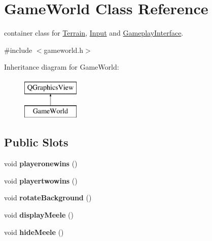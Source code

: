 \hypertarget{class_game_world}{}\section{Game\+World Class Reference}
\label{class_game_world}


container class for \hyperlink{class_terrain}{Terrain}, \hyperlink{class_input}{Input} and \hyperlink{class_gameplay_interface}{Gameplay\+Interface}.  




{\ttfamily \#include $<$gameworld.\+h$>$}

Inheritance diagram for Game\+World\+:\begin{figure}[H]
\begin{center}
\leavevmode
\includegraphics[height=2.000000cm]{class_game_world}
\end{center}
\end{figure}
\subsection*{Public Slots}
\begin{DoxyCompactItemize}
\item 
void {\bfseries playeronewins} ()\hypertarget{class_game_world_ada24b43c2a2c6d8147f2054a1e4a71c0}{}\label{class_game_world_ada24b43c2a2c6d8147f2054a1e4a71c0}

\item 
void {\bfseries playertwowins} ()\hypertarget{class_game_world_a6a0c32cf4eea04374ea6c4ec75ed3737}{}\label{class_game_world_a6a0c32cf4eea04374ea6c4ec75ed3737}

\item 
void {\bfseries rotate\+Background} ()\hypertarget{class_game_world_a4b17ac101198095db71b34cfd87b97b2}{}\label{class_game_world_a4b17ac101198095db71b34cfd87b97b2}

\item 
void {\bfseries display\+Meele} ()\hypertarget{class_game_world_a0b7431a3b73fbbf9a82fa1dc4bf66044}{}\label{class_game_world_a0b7431a3b73fbbf9a82fa1dc4bf66044}

\item 
void {\bfseries hide\+Meele} ()\hypertarget{class_game_world_a4933e2019efbb8f0eaab67c207ed88ae}{}\label{class_game_world_a4933e2019efbb8f0eaab67c207ed88ae}

\end{DoxyCompactItemize}
